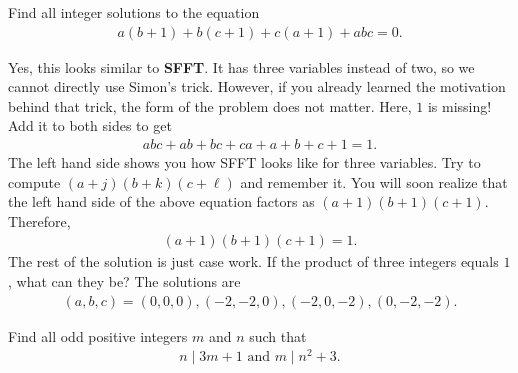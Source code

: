 \documentclass{subfile}
\begin{document}
	\begin{problem}
		Find all integer solutions to the equation
			\begin{align*}
				a(b+1)+b(c+1)+c(a+1)+abc=0.
			\end{align*}
	\end{problem}

	\begin{solution}
		Yes, this looks similar to \textbf{SFFT}. It has three variables instead of two, so we cannot directly use Simon's trick. However, if you already learned the motivation behind that trick, the form of the problem does not matter. Here, $1$ is missing! Add it to both sides to get
			\begin{align*}
				abc+ab+bc+ca+a+b+c+1=1.
			\end{align*}
		The left hand side shows you how SFFT looks like for three variables. Try to compute $(a+j)(b+k)(c+\ell)$ and remember it. You will soon realize that the left hand side of the above equation factors as $(a+1)(b+1)(c+1)$. Therefore,
			\begin{align*}
				(a+1)(b+1)(c+1)=1.
			\end{align*}
		The rest of the solution is just case work. If the product of three integers equals $1$, what can they be? The solutions are
			\begin{align*}
				(a,b,c)=(0,0,0), (-2,-2,0), (-2,0,-2), (0,-2,-2).
			\end{align*}
	\end{solution}

	\begin{problem}
		Find all odd positive integers $m$ and $n$ such that
			\begin{align*}
				n\mid 3m+1 \mbox{ and } m\mid n^2+3.
			\end{align*}
	\end{problem}
\end{document}
